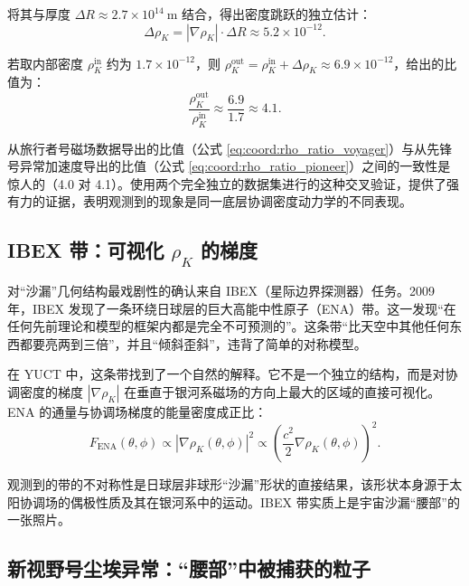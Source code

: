 \documentclass[11pt,a4paper]{article}
\theoremstyle{remark}
\begin{document}
	将其与厚度 \(\Delta R \approx 2.7 \times 10^{14}\ \text{m}\) 结合，得出密度跳跃的独立估计：
	\begin{equation}
		\Delta \rho_K = |\nabla \rho_K| \cdot \Delta R \approx 5.2 \times 10^{-12}.
		\label{eq:coord:delta_rho_pioneer}
	\end{equation}
	
	若取内部密度 \(\rho_K^{\text{in}}\) 约为 \(1.7 \times 10^{-12}\)，则 \(\rho_K^{\text{out}} = \rho_K^{\text{in}} + \Delta \rho_K \approx 6.9 \times 10^{-12}\)，给出的比值为：
	\begin{equation}
		\frac{\rho_K^{\text{out}}}{\rho_K^{\text{in}}} \approx \frac{6.9}{1.7} \approx 4.1.
		\label{eq:coord:rho_ratio_pioneer}
	\end{equation}
	
	从旅行者号磁场数据导出的比值（公式 \eqref{eq:coord:rho_ratio_voyager}）与从先锋号异常加速度导出的比值（公式 \eqref{eq:coord:rho_ratio_pioneer}）之间的一致性是惊人的（4.0 对 4.1）。使用两个完全独立的数据集进行的这种交叉验证，提供了强有力的证据，表明观测到的现象是同一底层协调密度动力学的不同表现。
	
	\subsection{IBEX 带：可视化 \(\rho_K\) 的梯度}
	\label{subsec:coord:ibex}
	
	对“沙漏”几何结构最戏剧性的确认来自 IBEX（星际边界探测器）任务。2009 年，IBEX 发现了一条环绕日球层的巨大高能中性原子（ENA）带。这一发现“在任何先前理论和模型的框架内都是完全不可预测的”。这条带“比天空中其他任何东西都要亮两到三倍”，并且“倾斜歪斜”，违背了简单的对称模型。
	
	在 YUCT 中，这条带找到了一个自然的解释。它不是一个独立的结构，而是对协调密度的梯度 \(|\nabla \rho_K|\) 在垂直于银河系磁场的方向上最大的区域的直接可视化。ENA 的通量与协调场梯度的能量密度成正比：
	\begin{equation}
		F_{\text{ENA}}(\theta, \phi) \propto |\nabla \rho_K(\theta, \phi)|^2 \propto \left( \frac{c^2}{2} \nabla \rho_K(\theta, \phi) \right)^2.
		\label{eq:coord:ibex_flux}
	\end{equation}
	
	观测到的带的不对称性是日球层非球形“沙漏”形状的直接结果，该形状本身源于太阳协调场的偶极性质及其在银河系中的运动。IBEX 带实质上是宇宙沙漏“腰部”的一张照片。
	
	\subsection{新视野号尘埃异常：“腰部”中被捕获的粒子}
	\label{subsec:coord:newhorizons}
	
\end{document}
